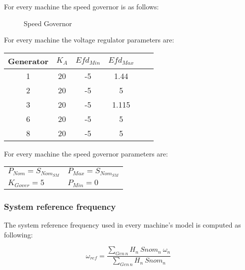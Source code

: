 \documentclass[a4paper, 12pt]{report}
\begin{document}
For every machine the speed governor is as follows:
\begin{figure}[H]
\centering
{}
\caption{Speed Governor}
\end{figure}

For every machine the voltage regulator parameters are:
\begin{center}
\begin{tabular}{|c|c|c|c|c|c|}
  \hline
  Generator & $K_{A}$  & $Efd_{Min}$ & $Efd_{Max}$\\
  \hline
  1 & 20 & -5 & 1.44\\
  2 & 20 & -5 & 5\\
  3 & 20 & -5 & 1.115\\
  6 & 20 & -5 & 5\\
  8 & 20 & -5 & 5\\
  \hline
\end{tabular}
\end{center}

For every machine the speed governor parameters are:
\begin{center}
\begin{tabular}{l|l}
   $P_{Nom}=S_{Nom_{SM}}$ & $P_{Max}=S_{Nom_{SM}}$  \\
   $K_{Gover}=5$ & $P_{Min}=0$   \\
\end{tabular}
\end{center}

\subsubsection{System reference frequency}

The system reference frequency used in every machine's model is computed as following:

\[
 \omega_{ref} = \frac{\sum_{Gen \hspace{2pt} n} H_{n} \ Snom_{n} \ \omega_{n}}{\sum_{Gen \hspace{2pt} n} H_{n} \ Snom_{n}}
\]
\end{document}
